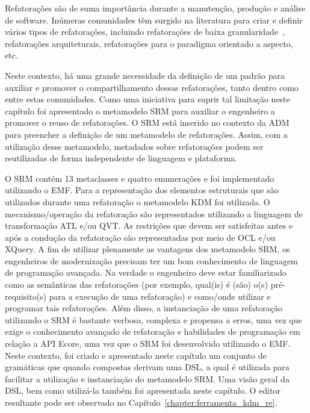 Refatorações são de suma importância durante a manutenção, produção e análise de software. Inúmeras comunidades têm surgido na literatura para criar e definir vários tipos de refatorações, incluindo refatorações de baixa granularidade~\cite{Fowler1999, Demeyer1, Demeyer2}, refatorações arquiteturais, refatorações para o paradigma orientado a aspecto, etc. 

Neste contexto, há uma grande necessidade da definição de um padrão para auxiliar e promover o compartilhamento dessas refatorações, tanto dentro como entre estas comunidades. Como uma iniciativa para suprir tal limitação neste capítulo foi apresentado o metamodelo SRM para auxiliar o engenheiro a promover o reuso de refatorações. O SRM está inserido no contexto da ADM para preencher a definição de um metamodelo de refatorações. Assim, com a utilização desse metamodelo, metadados sobre refatorações podem ser reutilizadas de forma independente de linguagem e plataforma.

O SRM contém 13 metaclasses e quatro enumerações e foi implementado utilizando o EMF. Para a representação dos elementos estruturais que são utilizados durante uma refatoração o metamodelo KDM foi utilizada. O mecanismo/operação da refatoração são representados utilizando a linguagem de transformação ATL e/ou QVT. As restrições que devem ser satisfeitas antes e após a condução da refatoração são representadas por meio de OCL e/ou XQuery. A fim de utilizar plenamente as vantagens dos metamodelo SRM, os engenheiros de modernização precisam ter um bom conhecimento de linguagem de programação avançada. Na verdade o engenheiro deve estar familiarizado como as semânticas das refatorações (por exemplo, qual(is) é (são) o(s) pré-requisito(s) para a execução de uma refatoração) e como/onde utilizar e programar tais refatorações. Além disso, a instanciação de uma refatoração utilizando o SRM é bastante verbosa, complexa e propensa a erros, uma vez que exige o conhecimento avançado de refatoração e habilidades de programação em relação a API Ecore, uma vez que o SRM foi desenvolvido utilizando o EMF. Neste contexto, foi criado e apresentado neste capítulo um conjunto de gramáticas que quando compostas derivam uma DSL, a qual é utilizada para facilitar a utilização e instanciação do metamodelo SRM. Uma visão geral da DSL, bem como utilizá-la também foi apresentada neste capítulo. O editor resultante pode ser observado no Capítulo~\ref{chapter:ferramenta_kdm_re}. %



